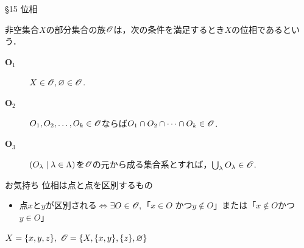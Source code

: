 \documentclass[uplatex,a4paper,dvipdfmx,aspectratio=169,11pt]{beamer}
\begin{document}
\begin{frame}[fragile]{\S 15 位相}
    \begin{block}{}
        非空集合$X$の部分集合の族$\mathscr{O}$は，次の条件を満足するとき$X$の\alert{位相}であるという．
       \begin{description}
           \item[$\textbf{O}_1$] $X \in \mathscr{O}, \varnothing \in \mathscr{O}$.
           \item[$\textbf{O}_2$] $O_1, O_2, \ldots, O_k \in \mathscr{O}$ならば$O_1 \cap O_2 \cap \dots \cap O_k \in \mathscr{O}$.
           \item[$\textbf{O}_3$] $\qty(O_\lambda \mid \lambda \in \Lambda)$を$\mathscr{O}$の元から成る集合系とすれば，$\bigcup_\lambda O_\lambda \in \mathscr{O}$.
       \end{description} 
    \end{block}

    \begin{alertblock}{お気持ち}
        位相は\alert{点と点を区別する}もの
        \begin{itemize}
            \item 点$x$と$y$が区別される$\iff$$\exists O \in \mathscr{O},$「$x \in O$ かつ$y \notin O$」または「$x \notin O$かつ$y \in O$」
        \end{itemize}
    \end{alertblock}

    \medskip{}

    $X = \qty{x, y, z},\ \mathscr{O} = \qty{X, \qty{x, y}, \qty{z}, \varnothing}$
    \begin{figure}[H]
        \centering
    \end{figure} 
\end{frame}
\end{document}
